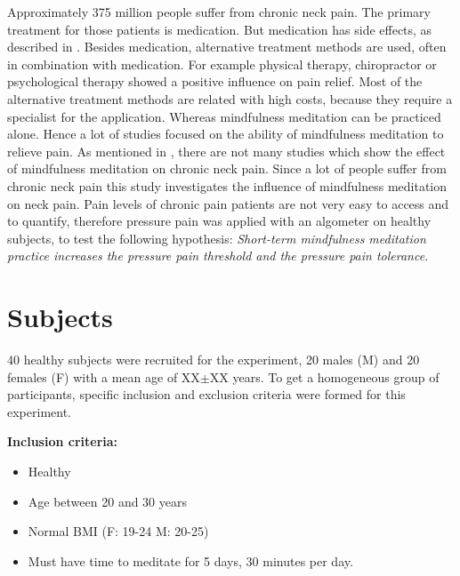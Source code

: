Approximately 375 million people suffer from chronic neck pain. The primary treatment for those patients is medication. But medication has side effects, as described in .  Besides medication, alternative treatment methods are used, often in combination with medication. For example physical therapy, chiropractor or psychological therapy showed a positive influence on pain relief. Most of the alternative treatment methods are related with high costs, because they require a specialist for the application. Whereas mindfulness meditation can be  practiced alone. Hence a lot of studies focused on the ability of mindfulness meditation to relieve pain.
As mentioned in , there are not many studies which show the effect of mindfulness meditation on chronic neck pain. Since a lot of people suffer from chronic neck pain this study investigates the influence of mindfulness meditation on neck pain. Pain levels of chronic pain patients are not very easy to access and to quantify, therefore pressure pain was applied with an algometer on healthy subjects, to test the following hypothesis:
\textit{Short-term mindfulness meditation practice increases the pressure pain threshold and the pressure pain tolerance.}


\section{Subjects}
40 healthy subjects were recruited for the experiment, 20 males (M) and 20 females
(F) with a mean age of XX$\pm$XX years. To get a homogeneous group of participants, specific inclusion and exclusion criteria were  formed for this experiment.

\textbf{Inclusion criteria:}
\vspace{-.5cm}
\begin{itemize}
	\item Healthy
	\vspace{-.3cm}
	\item Age between 20 and 30 years
	\vspace{-.3cm}
	\item Normal BMI (F: 19-24 M: 20-25)
	\vspace{-.3cm}
	\item Must have time to meditate for 5 days, 30 minutes per day.
\end{itemize}

